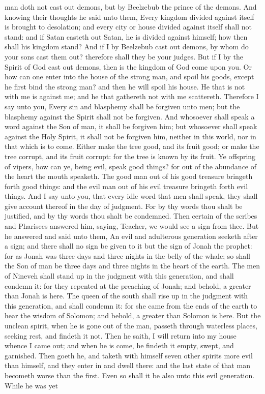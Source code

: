 man doth not cast out demons, but by Beelzebub the prince of the demons. And knowing their thoughts he said unto them, Every kingdom divided against itself is brought to desolation; and every city or house divided against itself shall not stand: and if Satan casteth out Satan, he is divided against himself; how then shall his kingdom stand? And if I by Beelzebub cast out demons, by whom do your sons cast them out? therefore shall they be your judges. But if I by the Spirit of God cast out demons, then is the kingdom of God come upon you. Or how can one enter into the house of the strong man, and spoil his goods, except he first bind the strong man? and then he will spoil his house. He that is not with me is against me; and he that gathereth not with me scattereth. Therefore I say unto you, Every sin and blasphemy shall be forgiven unto men; but the blasphemy against the Spirit shall not be forgiven. And whosoever shall speak a word against the Son of man, it shall be forgiven him; but whosoever shall speak against the Holy Spirit, it shall not be forgiven him, neither in this world, nor in that which is to come. Either make the tree good, and its fruit good; or make the tree corrupt, and its fruit corrupt: for the tree is known by its fruit. Ye offspring of vipers, how can ye, being evil, speak good things? for out of the abundance of the heart the mouth speaketh. The good man out of his good treasure bringeth forth good things: and the evil man out of his evil treasure bringeth forth evil things. And I say unto you, that every idle word that men shall speak, they shall give account thereof in the day of judgment. For by thy words thou shalt be justified, and by thy words thou shalt be condemned.  Then certain of the scribes and Pharisees answered him, saying, Teacher, we would see a sign from thee. But he answered and said unto them, An evil and adulterous generation seeketh after a sign; and there shall no sign be given to it but the sign of Jonah the prophet: for as Jonah was three days and three nights in the belly of the whale; so shall the Son of man be three days and three nights in the heart of the earth. The men of Nineveh shall stand up in the judgment with this generation, and shall condemn it: for they repented at the preaching of Jonah; and behold, a greater than Jonah is here. The queen of the south shall rise up in the judgment with this generation, and shall condemn it: for she came from the ends of the earth to hear the wisdom of Solomon; and behold, a greater than Solomon is here. But the unclean spirit, when he is gone out of the man, passeth through waterless places, seeking rest, and findeth it not. Then he saith, I will return into my house whence I came out; and when he is come, he findeth it empty, swept, and garnished. Then goeth he, and taketh with himself seven other spirits more evil than himself, and they enter in and dwell there: and the last state of that man becometh worse than the first. Even so shall it be also unto this evil generation.  While he was yet 